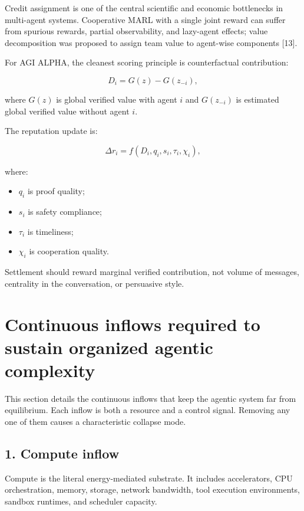 Credit assignment is one of the central scientific and economic
bottlenecks in multi-agent systems. Cooperative MARL with a single joint
reward can suffer from spurious rewards, partial observability, and
lazy-agent effects; value decomposition was proposed to assign team
value to agent-wise components {[}13{]}.

For AGI ALPHA, the cleanest scoring principle is counterfactual
contribution:

\[
D_i=G(z)-G(z_{-i}),
\]

where \(G(z)\) is global verified value with agent \(i\) and
\(G(z_{-i})\) is estimated global verified value without agent \(i\).

The reputation update is:

\[
\Delta r_i=f(D_i,q_i,s_i,\tau_i,\chi_i),
\]

where:

\begin{itemize}
\tightlist
\item
  \(q_i\) is proof quality;
\item
  \(s_i\) is safety compliance;
\item
  \(\tau_i\) is timeliness;
\item
  \(\chi_i\) is cooperation quality.
\end{itemize}

Settlement should reward marginal verified contribution, not volume of
messages, centrality in the conversation, or persuasive style.

\section{Continuous inflows required to sustain organized agentic
complexity}\label{continuous-inflows-required-to-sustain-organized-agentic-complexity}

This section details the continuous inflows that keep the agentic system
far from equilibrium. Each inflow is both a resource and a control
signal. Removing any one of them causes a characteristic collapse mode.

\subsection{1. Compute inflow}\label{compute-inflow}

Compute is the literal energy-mediated substrate. It includes
accelerators, CPU orchestration, memory, storage, network bandwidth,
tool execution environments, sandbox runtimes, and scheduler capacity.

